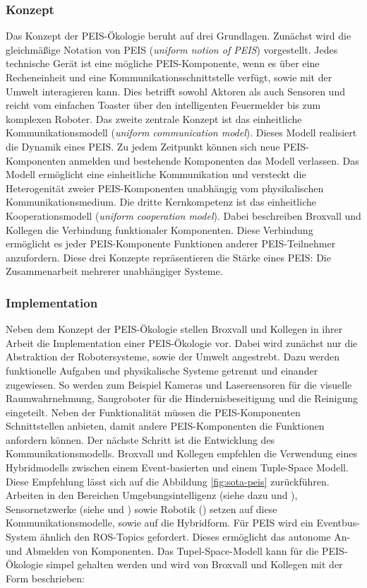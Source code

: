 \subsubsection{Konzept}
Das Konzept der PEIS-Ökologie beruht auf drei Grundlagen. Zunächst wird die gleichmäßige Notation von PEIS (\textit{uniform notion of PEIS}) vorgestellt. Jedes technische Gerät ist eine mögliche PEIS-Komponente, wenn es über eine Recheneinheit und eine Kommunikationsschnittstelle verfügt, sowie mit der Umwelt interagieren kann. Dies betrifft sowohl Aktoren als auch Sensoren und reicht vom einfachen Toaster über den intelligenten Feuermelder bis zum komplexen Roboter. Das zweite zentrale Konzept ist das einheitliche Kommunikationsmodell (\textit{uniform communication model}). Dieses Modell realisiert die Dynamik eines PEIS. Zu jedem Zeitpunkt können sich neue PEIS-Komponenten anmelden und bestehende Komponenten das Modell verlassen. Das Modell \glqq ermöglicht eine einheitliche Kommunikation und versteckt die Heterogenität zweier PEIS-Komponenten unabhängig vom physikalischen Kommunikationsmedium.\grqq \cite{Saffiotti:2005:PEA:1107548.1107615} Die dritte Kernkompetenz ist das einheitliche Kooperationsmodell (\textit{uniform cooperation model}). Dabei beschreiben Broxvall und Kollegen die Verbindung funktionaler Komponenten. Diese Verbindung ermöglicht es jeder PEIS-Komponente Funktionen anderer PEIS-Teilnehmer anzufordern. Diese drei Konzepte repräsentieren die Stärke eines PEIS: Die Zusammenarbeit mehrerer unabhängiger Systeme. \cite{Saffiotti:2005:PEA:1107548.1107615}

\subsubsection{Implementation}
\label{sec:peis-imple}
Neben dem Konzept der PEIS-Ökologie stellen Broxvall und Kollegen in ihrer Arbeit die Implementation einer PEIS-Ökologie vor. Dabei wird zunächst nur die Abstraktion der Robotersysteme, sowie der Umwelt angestrebt. Dazu werden funktionelle Aufgaben und physikalische Systeme getrennt und einander zugewiesen. So werden zum Beispiel Kameras und Lasersensoren für die visuelle Raumwahrnehmung, Saugroboter für die Hindernisbeseitigung und die Reinigung eingeteilt. Neben der Funktionalität müssen die PEIS-Komponenten Schnittstellen anbieten, damit andere PEIS-Komponenten die Funktionen anfordern können. Der nächste Schritt ist die Entwicklung des Kommunikationsmodells. Broxvall und Kollegen empfehlen die Verwendung eines Hybridmodells zwischen einem Event-basierten und einem Tuple-Space Modell. Diese Empfehlung lässt sich auf die Abbildung \ref{fig:sota-peis} zurückführen. Arbeiten in den Bereichen Umgebungsintelligenz (siehe dazu \cite{arregui2003stitch} und \cite{siegemund2004context}), Sensornetzwerke (siehe \cite{adjie1999design} und \cite{heidemann2001building}) sowie Robotik (\cite{caceres2003real}) setzen auf diese Kommunikationsmodelle, sowie auf die Hybridform. Für PEIS wird ein Eventbus-System ähnlich den ROS-Topics gefordert. Dieses ermöglicht das autonome An- und Abmelden von Komponenten. Das Tupel-Space-Modell kann für die PEIS-Ökologie simpel gehalten werden und wird von Broxvall und Kollegen mit der Form beschrieben:

